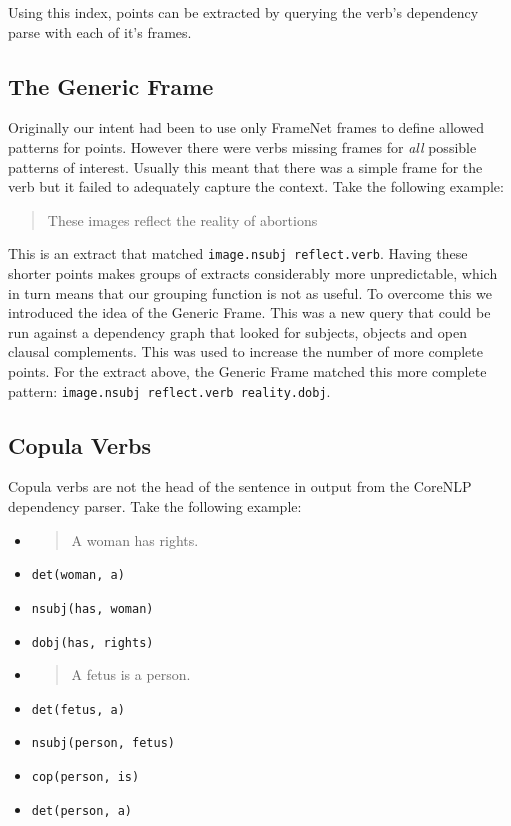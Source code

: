       Using this index, points can be extracted by querying the verb's dependency parse with each of it's frames.

    \tocless\subsection{The Generic Frame}
      Originally our intent had been to use only FrameNet frames to define allowed patterns for points. However there were verbs missing frames for \textit{all} possible patterns of interest. Usually this meant that there was a simple frame for the verb but it failed to adequately capture the context. Take the following example:

      \blockquote{These images reflect the reality of abortions}

      This is an extract that matched \texttt{image.nsubj reflect.verb}. Having these shorter points makes groups of extracts considerably more unpredictable, which in turn means that our grouping function is not as useful. To overcome this we introduced the idea of the Generic Frame. This was a new query that could be run against a dependency graph that looked for subjects, objects and open clausal complements. This was used to increase the number of more complete points. For the extract above, the Generic Frame matched this more complete pattern: \texttt{image.nsubj reflect.verb reality.dobj}.

    \tocless\subsection{Copula Verbs}
      Copula verbs are not the head of the sentence in output from the CoreNLP dependency parser. Take the following example:
      \begin{multicols}{2}
        \raggedcolumns
        \begin{itemize}[label={}]
          \item{\blockquote{A woman has rights.}}
          \item{\texttt{det(woman, a)}}
          \item{\texttt{nsubj(has, woman)}}
          \item{\texttt{dobj(has, rights)}}
        \end{itemize}
        \columnbreak
        \begin{itemize}[label={}]
          \item{\blockquote{A fetus is a person.}}
          \item{\texttt{det(fetus, a)}}
          \item{\texttt{nsubj(person, fetus)}}
          \item{\texttt{cop(person, is)}}
          \item{\texttt{det(person, a)}}
        \end{itemize}
      \end{multicols}

